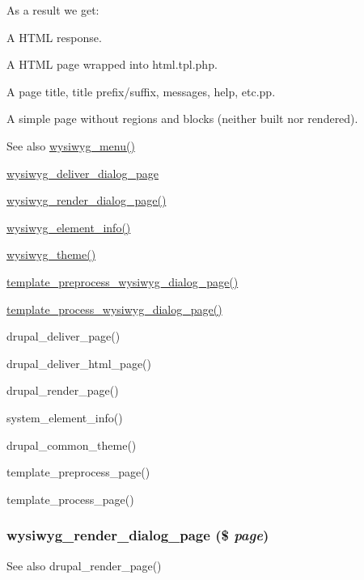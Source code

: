 As a result we get:
\begin{DoxyItemize}
\item A HTML response.
\item A HTML page wrapped into html.tpl.php.
\item A page title, title prefix/suffix, messages, help, etc.pp.
\item A simple page without regions and blocks (neither built nor rendered).
\end{DoxyItemize}

\begin{DoxySeeAlso}{See also}
\hyperlink{wysiwyg_8module_a7bbcb615ff86965ede6de1ebdaf1f360}{wysiwyg\_\-menu()} 

\hyperlink{wysiwyg_8dialog_8inc_a11742186be99db206b09a5682afa2130}{wysiwyg\_\-deliver\_\-dialog\_\-page} 

\hyperlink{wysiwyg_8dialog_8inc_a7c9acb68c62f91fa07a346e18d70407f}{wysiwyg\_\-render\_\-dialog\_\-page()} 

\hyperlink{wysiwyg_8module_a558b7da961229a8d501fa8581d802093}{wysiwyg\_\-element\_\-info()} 

\hyperlink{wysiwyg_8module_a03b61c521946527bba7ecee753da3256}{wysiwyg\_\-theme()} 

\hyperlink{wysiwyg_8dialog_8inc_a01e89cc085ea9214d877749b55f50639}{template\_\-preprocess\_\-wysiwyg\_\-dialog\_\-page()} 

\hyperlink{wysiwyg_8dialog_8inc_ac59a9d7f504a104da018256132f53b60}{template\_\-process\_\-wysiwyg\_\-dialog\_\-page()}

drupal\_\-deliver\_\-page() 

drupal\_\-deliver\_\-html\_\-page() 

drupal\_\-render\_\-page() 

system\_\-element\_\-info() 

drupal\_\-common\_\-theme() 

template\_\-preprocess\_\-page() 

template\_\-process\_\-page() 
\end{DoxySeeAlso}
\hypertarget{wysiwyg_8dialog_8inc_a7c9acb68c62f91fa07a346e18d70407f}{
\subsubsection[{wysiwyg\_\-render\_\-dialog\_\-page}]{\setlength{\rightskip}{0pt plus 5cm}wysiwyg\_\-render\_\-dialog\_\-page (\$ {\em page})}}
\label{wysiwyg_8dialog_8inc_a7c9acb68c62f91fa07a346e18d70407f}
\begin{DoxySeeAlso}{See also}
drupal\_\-render\_\-page() 
\end{DoxySeeAlso}
